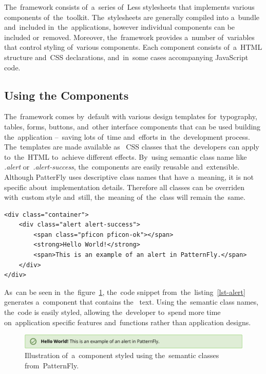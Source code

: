 The~framework consists of~a~series of~Less stylesheets that implements various
components of~the~toolkit. The~stylesheets are generally compiled into a~bundle
and~included in~the~applications, however individual components can be included
or~removed. Moreover, the~framework provides a~number of~variables that control
styling of~various components. Each component consists of~a~HTML structure
and~CSS declarations, and~in~some cases accompanying JavaScript code.


\subsection{Using the Components}
The~framework comes by~default with various design templates for~typography,
tables, forms, buttons, and~other interface components that can be used building
the~application --~saving lots of~time and~efforts in~the~development process.
The~templates are made available as~ CSS classes that
the~developers can apply to~the~HTML to~achieve different effects. By~using
semantic class name like \textit{.alert} or~\textit{.alert-success},
the~components are easily reusable and~extensible. Although PatterFly uses
descriptive class names that have a~meaning, it is not specific
about~implementation details. Therefore all classes can be overriden with~custom
style and~still, the~meaning of~the~class will remain the~same.

\begin{lstlisting}[caption=An~example of~styling the~component using predefined
class \textit{.alert}., label=lst-alert, style=dp-html]
<div class="container">
	<div class="alert alert-success">
		<span class="pficon pficon-ok"></span>
		<strong>Hello World!</strong>
		<span>This is an example of an alert in PatternFly.</span>
	</div>
</div>
\end{lstlisting}

As~can be seen in~the~figure~\ref{fig-alert}, the~code snippet
from~the~listing~\ref{lst-alert} generates a~component that contains
the~ text. Using the~semantic class names, the~code is easily
styled, allowing the~developer to~spend more time on~application specific
features and~functions rather than application designs.

\begin{figure}[!hbt]
	\centering
	\includegraphics[scale=0.8]{./figures/patternfly-alert.pdf}
	\caption{Illustration of~a~component styled using the~semantic classes
	from~PatternFly.}
	\label{fig-alert}
\end{figure}

